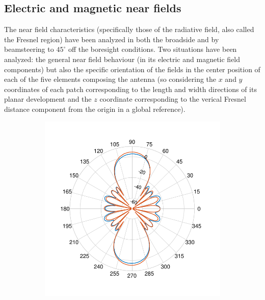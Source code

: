 \documentclass[12pt,a4paper]{article}
\begin{document}
{\begin{multicols}{2}
\subsection*{\selectfont\color{Turquoise}Electric and magnetic near fields}
The near field characteristics (specifically those of the radiative field, also called the Fresnel region) have been analyzed in both the broadside and by beamsteering to $45^\circ$ off the boresight conditions. Two situations have been analyzed: the general near field behaviour (in its electric and magnetic field components) but also the specific orientation of the fields in the center position of each of the five elements composing the antenna (so considering the $x$ and $y$ coordinates of each patch corresponding to the length and width directions of its planar development and the $z$ coordinate corresponding to the verical Fresnel distance component from the origin in a global reference). 
\end{multicols}
\begin{figure}
	\begin{center}
		\begin{subfigure}{0.25\linewidth}
			\includegraphics[scale=0.5]{pcb_pifa_array_azimuth_90_comparison.pdf}
			\caption{}
		\end{subfigure}
		\begin{subfigure}{0.25\linewidth}

\end{subfigure}
\end{center}
\end{figure}}
\end{document}
